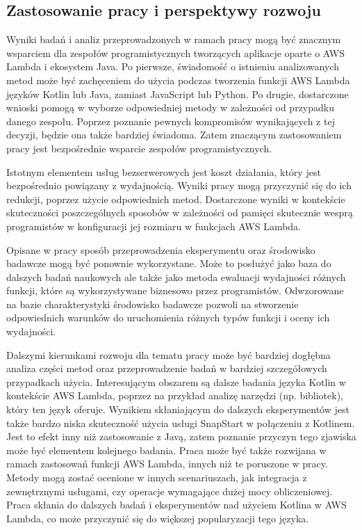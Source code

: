\subsection*{Zastosowanie pracy i perspektywy rozwoju}

Wyniki badań i analiz przeprowadzonych w ramach pracy mogą być znacznym wsparciem dla zespołów programistycznych tworzących aplikacje oparte o AWS Lambda i ekosystem Java.
Po pierwsze, świadomość o istnieniu analizowanych metod może być zachęceniem do użycia podczas tworzenia funkcji AWS Lambda języków Kotlin lub Java, zamiast JavaScript lub Python.
Po drugie, dostarczone wnioski pomogą w wyborze odpowiedniej metody w zależności od przypadku danego zespołu.
Poprzez poznanie pewnych kompromisów wynikających z tej decyzji, będzie ona także bardziej świadoma.
Zatem znaczącym zastosowaniem pracy jest bezpośrednie wsparcie zespołów programistycznych.

Istotnym elementem usług bezserwerowych jest koszt działania, który jest bezpośrednio powiązany z wydajnością.
Wyniki pracy mogą przyczynić się do ich redukcji, poprzez użycie odpowiednich metod.
Dostarczone wyniki w kontekście skuteczności poszczególnych sposobów w zależności od pamięci skutecznie wesprą programistów w konfiguracji jej rozmiaru w funkcjach AWS Lambda.

Opisane w pracy sposób przeprowadzenia eksperymentu oraz środowisko badawcze mogą być ponownie wykorzystane.
Może to posłużyć jako baza do dalszych badań naukowych ale także jako metoda ewaluacji wydajności różnych funkcji, które są wykorzystywane biznesowo przez programistów.
Odwzorowane na bazie charakterystyki środowisko badawcze pozwoli na stworzenie odpowiednich warunków do uruchomienia różnych typów funkcji i oceny ich wydajności.

Dalszymi kierunkami rozwoju dla tematu pracy może być bardziej dogłębna analiza części metod oraz przeprowadzenie badań w bardziej szczegółowych przypadkach użycia.
Interesującym obszarem są dalsze badania języka Kotlin w kontekście AWS Lambda, poprzez na przykład analizę narzędzi (np. bibliotek), który ten język oferuje.
Wynikiem skłaniającym do dalszych eksperymentów jest także bardzo niska skuteczność użycia usługi SnapStart w połączeniu z Kotlinem.
Jest to efekt inny niż zastosowanie z Javą, zatem poznanie przyczyn tego zjawiska może być elementem kolejnego badania.
Praca może być także rozwijana w ramach zastosowań funkcji AWS Lambda, innych niż te poruszone w pracy.
Metody mogą zostać ocenione w innych scenariuszach, jak integracja z zewnętrznymi usługami, czy operacje wymagające dużej mocy obliczeniowej.
Praca skłania do dalszych badań i eksperymentów nad użyciem Kotlina w AWS Lambda, co może przyczynić się do większej popularyzacji tego języka.
